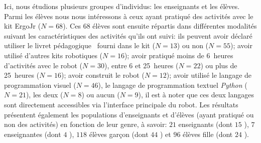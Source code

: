                 Ici, nous étudions plusieurs groupes d'individus: les enseignants et les élèves. Parmi les élèves nous nous intéressons à ceux ayant pratiqué des activités avec le kit ErgoJr ($N=68$). Ces $68$ élèves sont ensuite répartis dans différentes modalités suivant les caractéristiques des activités qu'ils ont suivi: ils peuvent avoir déclaré utiliser le livret pédagogique~ fourni dans le kit ($N=13$) ou non ($N=55$); avoir utilisé d'autres kits robotiques ($N=16$); avoir pratiqué moins de 6~heures d'activités avec le robot ($N=30$), entre 6 et 25~heures ($N=22$) ou plus de 25~heures ($N=16$); avoir construit le robot ($N=12$); avoir utilisé le langage de programmation visuel  ($N=46$), le langage de programmation textuel \textit{Python} ($N=21$), les deux ($N=8$) ou aucun ($N=9$), il est à noter que ces deux langages sont directement accessibles via l'interface principale du robot. Les résultats présentent également les populations d'enseignants et d'élèves (ayant pratiqué ou non des activités) en fonction de leur genre, à savoir: $21$ enseignants (dont $15$ ), $7$ enseignantes (dont $4$ ), $118$ élèves garçon (dont $44$ ) et $96$ élèves fille (dont $24$ ).
